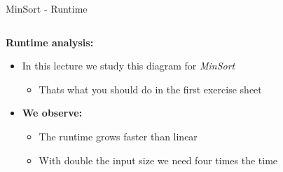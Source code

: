 
\begin{frame}{MinSort - Runtime}
  \begin{columns}%
    \begin{column}{0.5\textwidth}%
      \textbf{Runtime analysis:}
      \begin{itemize}
        \item
          In this lecture we study this diagram for \textit{MinSort}
          \begin{itemize}
            \item
              Thats what you should do in the first exercise sheet
          \end{itemize}
        \item
          \textbf{We observe:}\\
          \begin{itemize}
            \item
              The runtime {\color{Mittel-Blau}grows faster than linear}
            \item
              With double the input size we need four times the time
          \end{itemize}
      \end{itemize}
    \end{column}%
\end{columns}
\end{frame}
